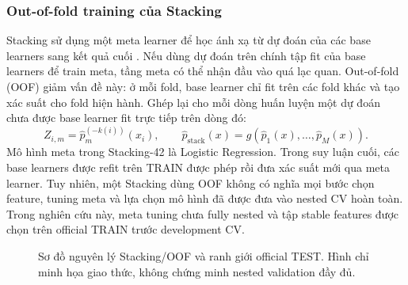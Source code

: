 \subsubsection{Out-of-fold training của Stacking}
Stacking sử dụng một meta learner để học ánh xạ từ dự đoán của các base learners sang kết quả cuối \cite{legacyL06}. Nếu dùng dự đoán trên chính tập fit của base learners để train meta, tầng meta có thể nhận đầu vào quá lạc quan. Out-of-fold (OOF) giảm vấn đề này: ở mỗi fold, base learner chỉ fit trên các fold khác và tạo xác suất cho fold hiện hành. Ghép lại cho mỗi dòng huấn luyện một dự đoán chưa được base learner fit trực tiếp trên dòng đó:
\begin{equation}
Z_{i,m}=\widehat p_m^{(-k(i))}(x_i),\qquad
\widehat p_{\mathrm{stack}}(x)=g\left(\widehat p_1(x),\ldots,\widehat p_M(x)\right).
\label{eq:stack}
\end{equation}
Mô hình meta trong Stacking-42 là Logistic Regression. Trong suy luận cuối, các base learners được refit trên TRAIN được phép rồi đưa xác suất mới qua meta learner. Tuy nhiên, một Stacking dùng OOF không có nghĩa mọi bước chọn feature, tuning meta và lựa chọn mô hình đã được đưa vào nested CV hoàn toàn. Trong nghiên cứu này, meta tuning chưa fully nested và tập stable features được chọn trên official TRAIN trước development CV.

\begin{figure}[htbp]
\centering
{}
\caption{Sơ đồ nguyên lý Stacking/OOF và ranh giới official TEST. Hình chỉ minh họa giao thức, không chứng minh nested validation đầy đủ.}
\label{fig:stacking-protocol}
\end{figure}

